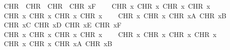 \begin{isabellebody}
\ \ \ \ CHR\ {\isacharprime}{\kern0pt}{\isacharprime}{\kern0pt}{\isacharbar}{\kern0pt}{\isacharprime}{\kern0pt}{\isacharprime}{\kern0pt}{\isacharcomma}{\kern0pt}\ CHR\ {\isacharprime}{\kern0pt}{\isacharprime}{\kern0pt}{\isacharbraceright}{\kern0pt}{\isacharprime}{\kern0pt}{\isacharprime}{\kern0pt}{\isacharcomma}{\kern0pt}\ CHR\ {\isacharprime}{\kern0pt}{\isacharprime}{\kern0pt}{\isachartilde}{\kern0pt}{\isacharprime}{\kern0pt}{\isacharprime}{\kern0pt}{\isacharcomma}{\kern0pt}\ CHR\ {}x{}F{\isacharcomma}{\kern0pt}\isanewline
\ \ \ \ CHR\ {}x{}{}{\isacharcomma}{\kern0pt}\ CHR\ {}x{}{}{\isacharcomma}{\kern0pt}\ CHR\ {}x{}{}{\isacharcomma}{\kern0pt}\ CHR\ {}x{}{}{\isacharcomma}{\kern0pt}\isanewline
\ \ \ \ CHR\ {}x{}{}{\isacharcomma}{\kern0pt}\ CHR\ {}x{}{}{\isacharcomma}{\kern0pt}\ CHR\ {}x{}{}{\isacharcomma}{\kern0pt}\ CHR\ {}x{}{}{\isacharcomma}{\kern0pt}\isanewline
\ \ \ \ CHR\ {}x{}{}{\isacharcomma}{\kern0pt}\ CHR\ {}x{}{}{\isacharcomma}{\kern0pt}\ CHR\ {}x{}A{\isacharcomma}{\kern0pt}\ CHR\ {}x{}B{\isacharcomma}{\kern0pt}\isanewline
\ \ \ \ CHR\ {}x{}C{\isacharcomma}{\kern0pt}\ CHR\ {}x{}D{\isacharcomma}{\kern0pt}\ CHR\ {}x{}E{\isacharcomma}{\kern0pt}\ CHR\ {}x{}F{\isacharcomma}{\kern0pt}\isanewline
\ \ \ \ CHR\ {}x{}{}{\isacharcomma}{\kern0pt}\ CHR\ {}x{}{}{\isacharcomma}{\kern0pt}\ CHR\ {}x{}{}{\isacharcomma}{\kern0pt}\ CHR\ {}x{}{}{\isacharcomma}{\kern0pt}\isanewline
\ \ \ \ CHR\ {}x{}{}{\isacharcomma}{\kern0pt}\ CHR\ {}x{}{}{\isacharcomma}{\kern0pt}\ CHR\ {}x{}{}{\isacharcomma}{\kern0pt}\ CHR\ {}x{}{}{\isacharcomma}{\kern0pt}\isanewline
\ \ \ \ CHR\ {}x{}{}{\isacharcomma}{\kern0pt}\ CHR\ {}x{}{}{\isacharcomma}{\kern0pt}\ CHR\ {}x{}A{\isacharcomma}{\kern0pt}\ CHR\ {}x{}B{\isacharcomma}{\kern0pt}\isanewline

\end{isabellebody}
